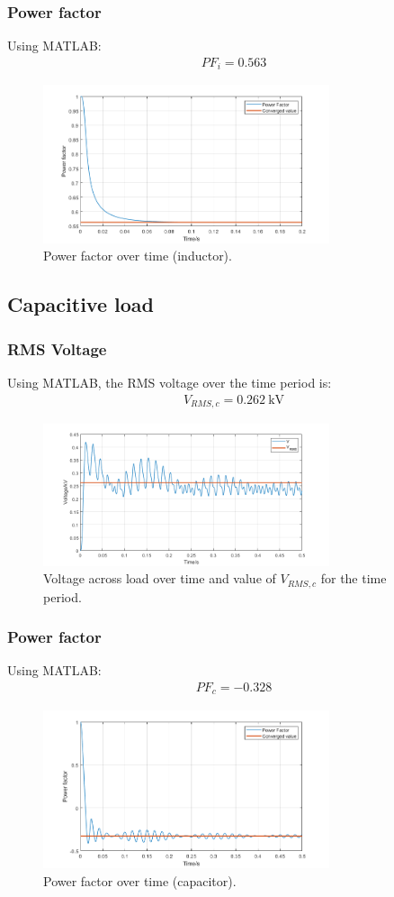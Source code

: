 \subsubsection{Power factor}
Using MATLAB:
\begin{gather}
    PF_{i} = 0.563
\end{gather}
\begin{figure}[H]
    \centering
    \includegraphics[width = 0.75\textwidth]{img/figure10.png}
    \caption{Power factor over time (inductor).}
    \label{fig:PFInductor}
\end{figure}
\subsection{Capacitive load}
\subsubsection{RMS Voltage}
Using MATLAB, the RMS voltage over the time period is:
\begin{gather}
    V_{RMS,c} = \SI{0.262}{\kilo\volt}
\end{gather}
\begin{figure}[H]
    \centering
    \includegraphics[width = 0.75\textwidth]{img/figure9.png}
    \caption{Voltage across load over time and value of $V_{RMS,c}$ for the time period.}
    \label{fig:VRMSCapacitor}
\end{figure}
\subsubsection{Power factor}
Using MATLAB:
\begin{gather}
    PF_{c} = -0.328
\end{gather}
\begin{figure}[H]
    \centering
    \includegraphics[width = 0.75\textwidth]{img/figure11.png}
    \caption{Power factor over time (capacitor).}
    \label{fig:PFCapacitor}
\end{figure}